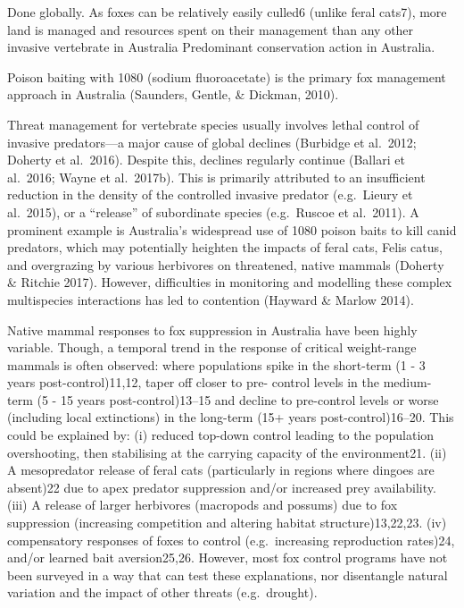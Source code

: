 \documentclass[11pt,a4paper,titlepage,twoside,openright]{style/unimelbthesis}
\begin{document}
\begin{mainmatter}
Done globally.
As foxes can be relatively easily culled6 (unlike feral cats7), more land is managed and resources spent on their management than any other invasive vertebrate in Australia
Predominant conservation action in Australia.

Poison baiting with 1080 (sodium fluoroacetate) is the primary fox management approach in Australia (Saunders, Gentle, \& Dickman, 2010).

Threat management for vertebrate species usually involves lethal control of invasive predators---a major cause of global declines (Burbidge et al.~2012; Doherty et al.~2016). Despite this, declines regularly continue (Ballari et al.~2016; Wayne et al.~2017b). This is primarily attributed to an insufficient reduction in the density of the controlled invasive predator (e.g.~Lieury et al.~2015), or a ``release'' of subordinate species (e.g.~Ruscoe et al.~2011). A prominent example is Australia's widespread use of 1080 poison baits to kill canid predators, which may potentially heighten the impacts of feral cats, Felis catus, and overgrazing by various herbivores on threatened, native mammals (Doherty \& Ritchie 2017). However, difficulties in monitoring and modelling these complex multispecies interactions has led to contention (Hayward \& Marlow 2014).

Native mammal responses to fox suppression in Australia have been highly variable. Though, a temporal trend in the response of critical weight-range mammals is often observed: where populations spike in the short-term (1 - 3 years post-control)11,12, taper off closer to pre- control levels in the medium-term (5 - 15 years post-control)13--15 and decline to pre-control levels or worse (including local extinctions) in the long-term (15+ years post-control)16--20. This could be explained by:
(i) reduced top-down control leading to the population overshooting, then stabilising at the carrying capacity of the environment21.
(ii) A mesopredator release of feral cats (particularly in regions where dingoes are absent)22 due to apex predator suppression and/or increased prey availability.
(iii) A release of larger herbivores (macropods and possums) due to fox suppression (increasing competition and altering habitat structure)13,22,23.
(iv) compensatory responses of foxes to control (e.g.~increasing reproduction rates)24, and/or learned bait aversion25,26.
However, most fox control programs have not been surveyed in a way that can test these explanations, nor disentangle natural variation and the impact of other threats (e.g.~drought).


\end{mainmatter}
\end{document}
